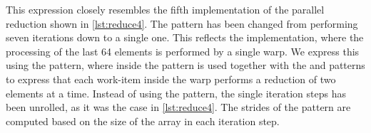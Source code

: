 %
This expression closely resembles the fifth implementation of the parallel reduction shown in \autoref{lst:reduce4}.
The \iterateN pattern has been changed from performing seven iterations down to a single one.
This reflects the \OpenCL implementation, where the processing of the last 64 elements is performed by a single warp.
We express this using the \mapWarp pattern, where inside the \mapLane pattern is used together with the \splitN and \join patterns to express that each work-item inside the warp performs a reduction of two elements at a time.
Instead of using the \iterateN pattern, the single iteration steps has been unrolled, as it was the case in \autoref{lst:reduce4}.
The strides of the \reorderStride pattern are computed based on the size of the array in each iteration step. 











